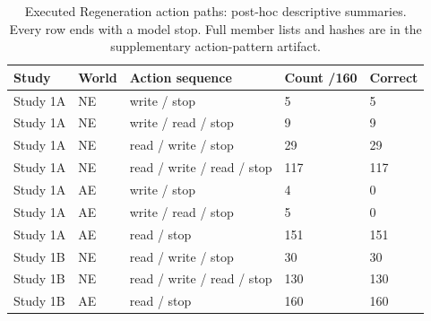 \begin{table}[t]
\centering
\caption{Executed Regeneration action paths: post-hoc descriptive summaries. Every row ends with a model stop. Full member lists and hashes are in the supplementary action-pattern artifact.}
\label{tab:s-actions}
\begin{tabular}{@{}lllll@{}}
\toprule
Study & World & Action sequence & Count /160 & Correct \\
\midrule
Study 1A & NE & write / stop & 5 & 5 \\
Study 1A & NE & write / read / stop & 9 & 9 \\
Study 1A & NE & read / write / stop & 29 & 29 \\
Study 1A & NE & read / write / read / stop & 117 & 117 \\
Study 1A & AE & write / stop & 4 & 0 \\
Study 1A & AE & write / read / stop & 5 & 0 \\
Study 1A & AE & read / stop & 151 & 151 \\
Study 1B & NE & read / write / stop & 30 & 30 \\
Study 1B & NE & read / write / read / stop & 130 & 130 \\
Study 1B & AE & read / stop & 160 & 160 \\
\bottomrule
\end{tabular}
\end{table}
